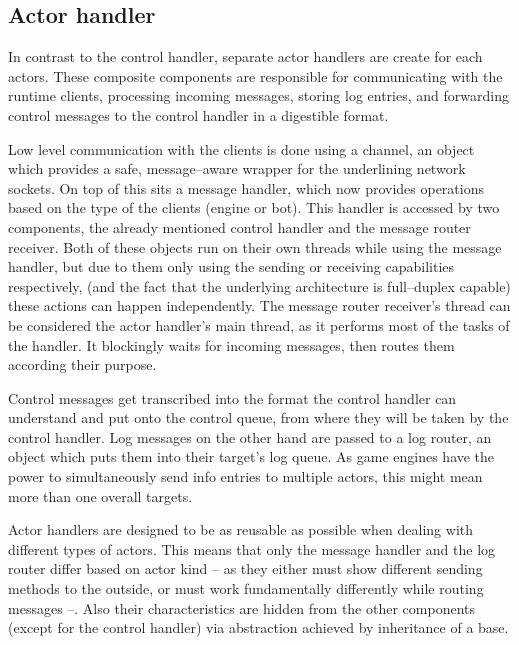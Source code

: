 \documentclass[11pt,a4paper,oneside]{report}
\begin{document}
		\subsection{Actor handler}

		In contrast to the control handler, separate actor handlers are create for each actors. These composite components are responsible for communicating with the runtime clients, processing incoming messages, storing log entries, and forwarding control messages to the control handler in a digestible format.
		
		Low level communication with the clients is done using a channel, an object which provides a safe, message--aware wrapper for the underlining network sockets. On top of this sits a message handler, which now provides operations based on the type of the clients (engine or bot). This handler is accessed by two components, the already mentioned control handler and the message router receiver. Both of these objects run on their own threads while using the message handler, but due to them only using the sending or receiving capabilities respectively, (and the fact that the underlying architecture is full--duplex capable) these actions can happen independently. The message router receiver's thread can be considered the actor handler's main thread, as it performs most of the tasks of the handler. It blockingly waits for incoming messages, then routes them according their purpose. 

		Control messages get transcribed into the format the control handler can understand and put onto the control queue, from where they will be taken by the control handler. Log messages on the other hand are passed to a log router, an object which puts them into their target's log queue. As game engines have the power to simultaneously send info entries to multiple actors, this might mean more than one overall targets.
		
		Actor handlers are designed to be as reusable as possible when dealing with different types of actors. This means that only the message handler and the log router differ based on actor kind -- as they either must show different sending methods to the outside, or must work fundamentally differently while routing messages --. Also their characteristics are hidden from the other components (except for the control handler) via abstraction achieved by inheritance of a base. 
\end{document}

